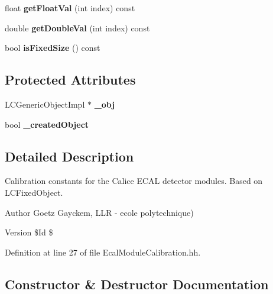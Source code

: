 \begin{DoxyCompactItemize}
\item 
float {\bfseries getFloatVal} (int index) const \label{classCALICE_1_1EcalModuleCalibration_ad184e2ba9450fec25ce4bc91dc7d16e3}

\item 
double {\bfseries getDoubleVal} (int index) const \label{classCALICE_1_1EcalModuleCalibration_a0bea8bda97e2024bcf32345cb69b21aa}

\item 
bool {\bfseries isFixedSize} () const \label{classCALICE_1_1EcalModuleCalibration_af56b25b11b910b8ceebd00758ef085b4}

\end{DoxyCompactItemize}
\subsection*{Protected Attributes}
\begin{DoxyCompactItemize}
\item 
LCGenericObjectImpl $\ast$ {\bfseries \_\-obj}\label{classCALICE_1_1EcalModuleCalibration_a3632376ffd5eee52d71c53faac4ce087}

\item 
bool {\bfseries \_\-createdObject}\label{classCALICE_1_1EcalModuleCalibration_af6aee165852f21a5152c3d5645410bae}

\end{DoxyCompactItemize}


\subsection{Detailed Description}
Calibration constants for the Calice ECAL detector modules. Based on LCFixedObject. \begin{DoxyAuthor}{Author}
Goetz Gayckem, LLR -\/ ecole polytechnique) 
\end{DoxyAuthor}
\begin{DoxyVersion}{Version}
\$Id \$ 
\end{DoxyVersion}


Definition at line 27 of file EcalModuleCalibration.hh.

\subsection{Constructor \& Destructor Documentation}
